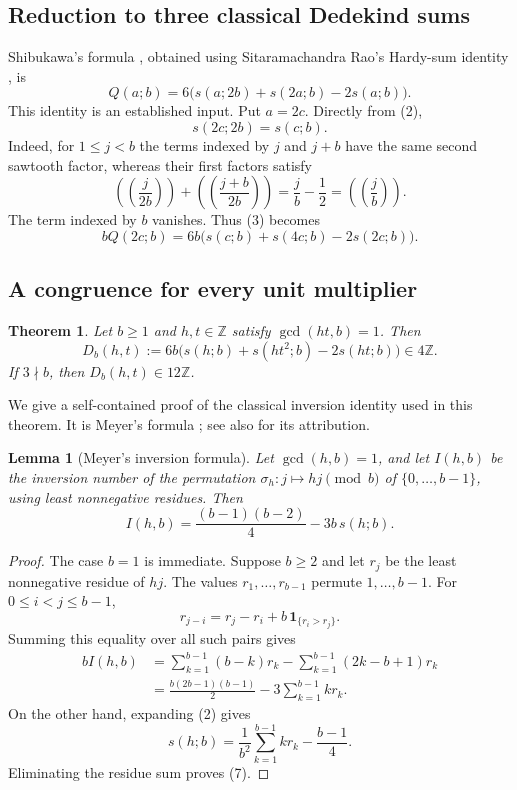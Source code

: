 \documentclass[11pt]{article}
\newtheorem{theorem}{Theorem}
\newtheorem{lemma}{Lemma}
\newcommand{\Z}{\mathbb Z}
\newcommand{\saw}[1]{\left(\!\left(#1\right)\!\right)}
\begin{document}
\subsection*{Reduction to three classical Dedekind sums}
Shibukawa's formula \cite[(4.3)]{S}, obtained using
Sitaramachandra Rao's Hardy-sum identity \cite{R}, is
\[
 Q(a;b)=6\bigl(s(a;2b)+s(2a;b)-2s(a;b)\bigr).                    \tag{3}
\]
This identity is an established input. Put $a=2c$. Directly from (2),
\[
 s(2c;2b)=s(c;b).                                                \tag{4}
\]
Indeed, for $1\le j<b$ the terms indexed by $j$ and $j+b$ have the
same second sawtooth factor, whereas their first factors satisfy
\[
 \saw{\frac{j}{2b}}+\saw{\frac{j+b}{2b}}
       =\frac jb-\frac12=\saw{\frac jb}.
\]
The term indexed by $b$ vanishes. Thus (3) becomes
\[
 bQ(2c;b)=6b\bigl(s(c;b)+s(4c;b)-2s(2c;b)\bigr).                 \tag{5}
\]

\subsection*{A congruence for every unit multiplier}
\begin{theorem}\label{general}
Let $b\ge1$ and $h,t\in\Z$ satisfy $\gcd(ht,b)=1$. Then
\[
 D_b(h,t):=6b\bigl(s(h;b)+s(ht^2;b)-2s(ht;b)\bigr)\in4\Z.
                                                                    \tag{6}
\]
If $3\nmid b$, then $D_b(h,t)\in12\Z$.
\end{theorem}
We give a self-contained proof of the classical inversion identity
used in this theorem. It is Meyer's formula \cite{M}; see also
\cite[Theorem 1.2]{T} for its attribution.

\begin{lemma}[Meyer's inversion formula]\label{meyer}
Let $\gcd(h,b)=1$, and let $I(h,b)$ be the inversion number of
the permutation $\sigma_h:j\mapsto hj\pmod b$ of
$\{0,\ldots,b-1\}$, using least nonnegative residues. Then
\[
 I(h,b)=\frac{(b-1)(b-2)}4-3b\,s(h;b).                            \tag{7}
\]
\end{lemma}
\begin{proof}
The case $b=1$ is immediate. Suppose $b\ge2$ and let $r_j$ be the
least nonnegative residue of $hj$. The values $r_1,\ldots,r_{b-1}$
permute $1,\ldots,b-1$. For $0\le i<j\le b-1$,
\[
 r_{j-i}=r_j-r_i+b\,\boldsymbol{1}_{\{r_i>r_j\}}.
\]
Summing this equality over all such pairs gives
\begin{align*}
 bI(h,b)
  &=\sum_{k=1}^{b-1}(b-k)r_k
       -\sum_{k=1}^{b-1}(2k-b+1)r_k\\
  &=\frac{b(2b-1)(b-1)}2-3\sum_{k=1}^{b-1}k r_k.
\end{align*}
On the other hand, expanding (2) gives
\[
 s(h;b)=\frac1{b^2}\sum_{k=1}^{b-1}k r_k-\frac{b-1}{4}.           \tag{8}
\]
Eliminating the residue sum proves (7).
\end{proof}
\end{document}
